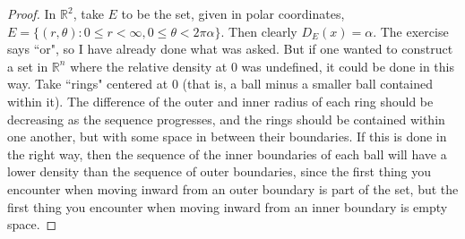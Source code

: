\documentclass[10pt]{article}
\newcommand{\R}{\mathbb{R}}
\begin{document}
\begin{enumerate}
\begin{enumerate}
\begin{proof}
In $\R^2$, take $E$ to be the set, given in polar coordinates, $E = \{(r, \theta) : 0 \leq r < \infty, 0 \leq \theta < 2 \pi \alpha\}$.  Then clearly $D_E(x) = \alpha$.  The exercise says ``or", so I have already done what was asked.  But if one wanted to construct a set in $\R^n$ where the relative density at $0$ was undefined, it could be done in this way.  Take ``rings" centered at $0$ (that is, a ball minus a smaller ball contained within it).  The difference of the outer and inner radius of each ring should be decreasing as the sequence progresses, and the rings should be contained within one another, but with some space in between their boundaries.  If this is done in the right way, then the sequence of the inner boundaries of each ball will have a lower density than the sequence of outer boundaries, since the first thing you encounter when moving inward from an outer boundary is part of the set, but the first thing you encounter when moving inward from an inner boundary is empty space.
\end{proof}

\end{enumerate}
\end{enumerate}
\end{document}
